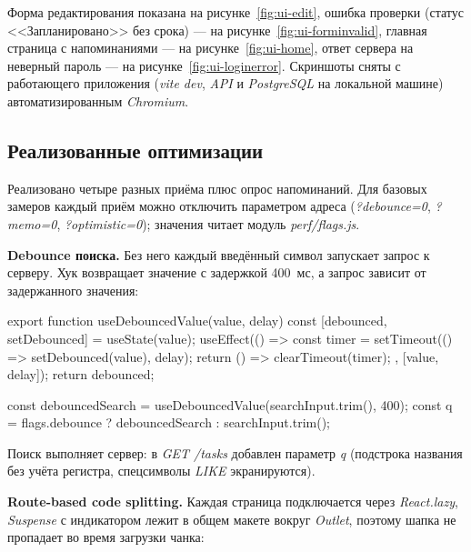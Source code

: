 \documentclass{stp}
\newcommand{\en}[1]{\textit{#1}}
\begin{document}
Форма редактирования показана на рисунке~\ref{fig:ui-edit}, ошибка
проверки (статус <<Запланировано>> без срока) --- на
рисунке~\ref{fig:ui-forminvalid}, главная страница с напоминаниями ---
на рисунке~\ref{fig:ui-home}, ответ сервера на неверный пароль --- на
рисунке~\ref{fig:ui-loginerror}. Скриншоты сняты с работающего
приложения (\en{vite dev}, \en{API} и \en{PostgreSQL} на локальной машине)
автоматизированным \en{Chromium}.





\subsection{Реализованные оптимизации}

Реализовано четыре разных приёма плюс опрос напоминаний. Для базовых
замеров каждый приём можно отключить параметром адреса (\en{?debounce=0},
\en{?memo=0}, \en{?optimistic=0}); значения читает модуль
\en{perf/flags.js}.

\textbf{Debounce поиска.} Без него каждый введённый символ запускает
запрос к серверу. Хук возвращает значение с задержкой 400~мс, а запрос
зависит от задержанного значения:

\begin{stplisting}
export function useDebouncedValue(value, delay) {
  const [debounced, setDebounced] = useState(value);
  useEffect(() => {
    const timer = setTimeout(() => setDebounced(value), delay);
    return () => clearTimeout(timer);
  }, [value, delay]);
  return debounced;
}

const debouncedSearch = useDebouncedValue(searchInput.trim(), 400);
const q = flags.debounce ? debouncedSearch : searchInput.trim();
\end{stplisting}

Поиск выполняет сервер: в \en{GET /tasks} добавлен параметр \en{q} (подстрока
названия без учёта регистра, спецсимволы \en{LIKE} экранируются).

\textbf{Route-based code splitting.} Каждая страница подключается через
\en{React.lazy}, \en{Suspense} с индикатором лежит в общем макете вокруг
\en{Outlet}, поэтому шапка не пропадает во время загрузки чанка:
\end{document}

